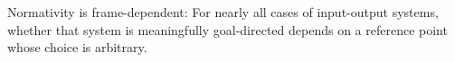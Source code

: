 \documentclass[11pt]{article} %
\begin{document}
%
%
%
%


%
\begin{claim}
Normativity is frame-dependent: For nearly all cases of input-output systems, whether that system is meaningfully goal-directed depends on a reference point whose choice is arbitrary.%
\end{claim}
\end{document}

